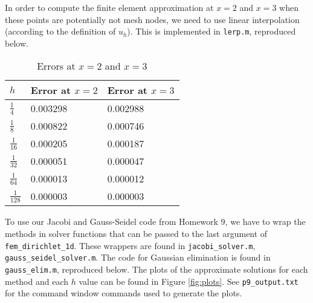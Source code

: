 \documentclass{homework}
\begin{document}
\begin{alphaparts}
		In order to compute the finite element approximation at $x=2$ and $x=3$ when these points are potentially not mesh nodes, we need to use linear interpolation (according to the definition of $u_h$). This is implemented in \verb*|lerp.m|, reproduced below.
		
		\begin{table}[h]
			\centering
			\begin{tabular}{@{}lll@{}}
				\toprule
				$h$ & Error at $x=2$ & Error at $x=3$ \\
				\midrule
				$\frac{1}{4}$ & 0.003298 & 0.002988 \\[.4em]
				$\frac{1}{8}$ & 0.000822 & 0.000746 \\[.4em]
				$\frac{1}{16}$ & 0.000205 & 0.000187 \\[.4em]
				$\frac{1}{32}$ & 0.000051 & 0.000047 \\[.4em]
				$\frac{1}{64}$ & 0.000013 & 0.000012 \\[.4em]
				$\frac{1}{128}$ & 0.000003 & 0.000003 \\[.4em]
				\bottomrule
			\end{tabular}
			\caption{Errors at $x=2$ and $x=3$}
			\label{table:errors23}
		\end{table}
	\end{alphaparts}
	
	\question
	To use our Jacobi and Gauss-Seidel code from Homework 9, we have to wrap the methods in solver functions that can be passed to the last argument of \verb*|fem_dirichlet_1d|. These wrappers are found in \verb*|jacobi_solver.m|, \verb*|gauss_seidel_solver.m|. The code for Gaussian elimination is found in \verb*|gauss_elim.m|, reproduced below. 
	The plots of the approximate solutions for each method and each $h$ value can be found in Figure \ref{fig:plots}. See \verb*|p9_output.txt| for the command window commands used to generate the plots.
	
	\begin{minipage}{\linewidth}
		
	\end{minipage}
	
\end{document}
